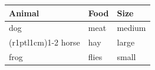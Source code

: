 \documentclass{article}
\begin{document}
 \begin{tabular}{@{} lll@{}} \toprule[2pt]
 Animal & Food & Size \\ \midrule[1pt]
 dog
 & meat & medium \\
 \cmidrule[0.5pt](r{1pt}l{1cm}){1-2}
 horse & hay & large \\
 frog & flies & small \\ \bottomrule[2pt]
 \end{tabular}
 
\end{document}
